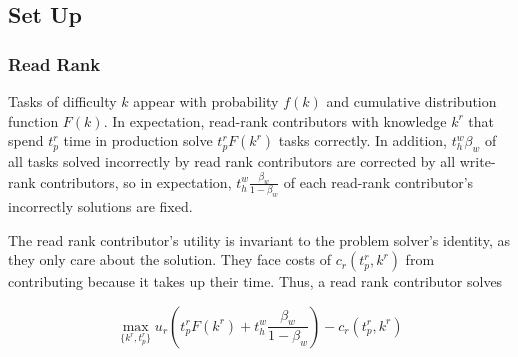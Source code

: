 \documentclass[12pt,notitlepage]{article}
\begin{document}
\subsection{Set Up}
\subsubsection{Read Rank}
Tasks of difficulty $k$ appear with probability $f(k)$ and cumulative distribution function $F(k)$. In expectation, read-rank contributors with knowledge $k^r$ that spend $t_p^r$ time in production solve $t_p^r F(k^r)$ tasks correctly. In addition, $t_h^w \beta_w$ of all tasks solved incorrectly by read rank contributors are corrected by all write-rank contributors, so in expectation, $t_h^w \frac{\beta_w}{1-\beta_w}$ of each read-rank contributor's incorrectly solutions are fixed. 

The read rank contributor's utility is invariant to the problem solver's identity, as they only care about the solution. They face costs of $c_r(t_p^r, k^r)$  from contributing because it takes up their time. Thus, a read rank contributor solves 

$$\max_{\{k^r, t_p^r\}} u_r\left(t_p^rF(k^r) + t_h^w \frac{\beta_w}{1-\beta_w}\right) - c_r(t_p^r, k^r)$$
\end{document}
